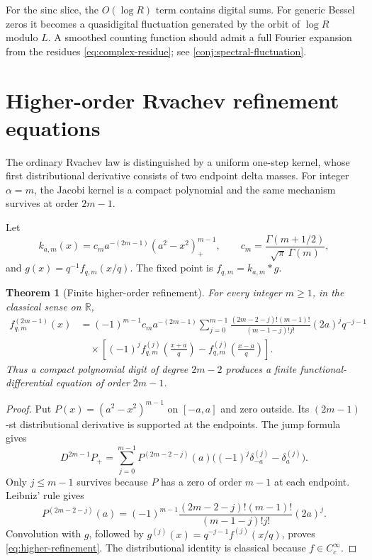 \documentclass[11pt]{article}
\newtheorem{theorem}{Theorem}[section]
\theoremstyle{definition}
\theoremstyle{remark}
\newcommand{\R}{\mathbb{R}}
\begin{document}
For the sinc slice, the \(O(\log R)\) term contains digital sums.  For generic
Bessel zeros it becomes a quasidigital fluctuation generated by the orbit of
\(\log R\) modulo \(L\).  A smoothed counting function should admit a full
Fourier expansion from the residues \eqref{eq:complex-residue}; see
\cref{conj:spectral-fluctuation}.

\section{Higher-order Rvachev refinement equations}
\label{sec:higher-refinement}

The ordinary Rvachev law is distinguished by a uniform one-step kernel, whose
first distributional derivative consists of two endpoint delta masses.  For
integer \(\alpha=m\), the Jacobi kernel is a compact polynomial and the same
mechanism survives at order \(2m-1\).

Let
\begin{equation}
 k_{a,m}(x)=c_m a^{-(2m-1)}(a^2-x^2)^{m-1}_+,
 \qquad
 c_m=\frac{\Gamma(m+1/2)}{\sqrt\pi\,\Gamma(m)},
 \label{eq:integer-kernel}
\end{equation}
and \(g(x)=q^{-1}f_{q,m}(x/q)\).  The fixed point is \(f_{q,m}=k_{a,m}*g\).

\begin{theorem}[Finite higher-order refinement]
\label{thm:higher-refinement}
For every integer \(m\ge1\), in the classical sense on \(\R\),
\begin{equation}
\boxed{
\begin{aligned}
 f_{q,m}^{(2m-1)}(x)
 &=(-1)^{m-1}c_ma^{-(2m-1)}
 \sum_{j=0}^{m-1}
 \frac{(2m-2-j)!(m-1)!}{(m-1-j)!j!}(2a)^j q^{-j-1}
 \\
 &\quad\times\left[
 (-1)^j f_{q,m}^{(j)}\left(\frac{x+a}{q}\right)
 -f_{q,m}^{(j)}\left(\frac{x-a}{q}\right)
 \right].
\end{aligned}}
 \label{eq:higher-refinement}
\end{equation}
Thus a compact polynomial digit of degree \(2m-2\) produces a finite
functional-differential equation of order \(2m-1\).
\end{theorem}

\begin{proof}
Put \(P(x)=(a^2-x^2)^{m-1}\) on \([-a,a]\) and zero outside.  Its
\((2m-1)\)-st distributional derivative is supported at the endpoints.  The
jump formula gives
\[
 D^{2m-1}P_+
 =\sum_{j=0}^{m-1}P^{(2m-2-j)}(a)
 \bigl((-1)^j\delta_{-a}^{(j)}-\delta_a^{(j)}\bigr).
\]
Only \(j\le m-1\) survives because \(P\) has a zero of order \(m-1\) at
each endpoint.  Leibniz' rule gives
\[
 P^{(2m-2-j)}(a)
 =(-1)^{m-1}
 \frac{(2m-2-j)!(m-1)!}{(m-1-j)!j!}(2a)^j.
\]
Convolution with \(g\), followed by
\(g^{(j)}(x)=q^{-j-1}f^{(j)}(x/q)\), proves
\eqref{eq:higher-refinement}.  The distributional identity is classical
because \(f\in C_c^\infty\).
\end{proof}
\end{document}
